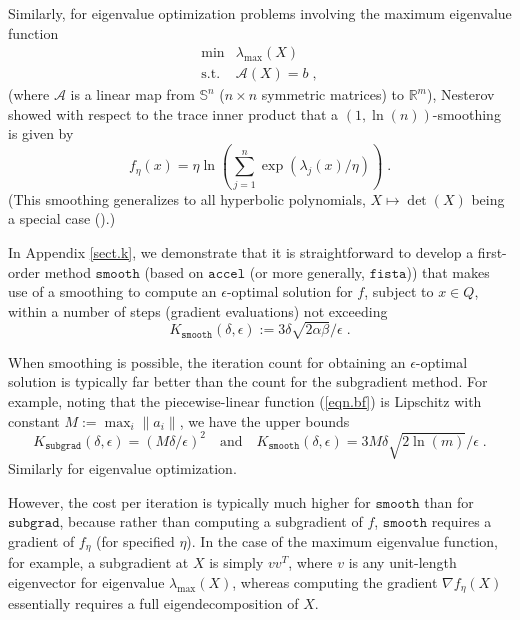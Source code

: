 \documentclass[reqno, 11pt]{amsart}
\numberwithin{equation}{section}
\newcommand{\subgrad}{\mathtt{subgrad}}
\newcommand{\accel}{\mathtt{accel}}
\newcommand{\fista}{\mathtt{fista}}
\newcommand{\smooth}{\mathtt{smooth}}
\newcommand{\grad}{\nabla}
\newcommand{\Sym}{ \mathbb{S}^n }
\begin{document}
Similarly, for eigenvalue optimization problems involving the maximum eigenvalue function
\[ \begin{array}{rl} \min & \lambda_{\max}(X) \\
\textrm{s.t.} & {\mathcal A}(X) = b \; , \end{array} \]
(where $ {\mathcal A} $ is a linear map from $ \Sym $ ($ n \times n $ symmetric matrices) to $ \mathbb{R}^{m} $), Nesterov\cite{nesterov2007smoothing}  showed with respect to the trace inner product that a $ (1, \ln(n)) $-smoothing is given by
\begin{equation}  \label{eqn.bh} 
    f_{\eta}(x) = \eta \ln \left( \sum_{j=1}^n \exp ( \lambda_j(x) / \eta) \right)  \; . 
\end{equation}
(This smoothing generalizes to all hyperbolic polynomials, $ X \mapsto \det(X)  $ being a special case (\cite{renegar2017accelerated}).)  

In Appendix \ref{sect.k}, we demonstrate that it is straightforward to develop a first-order method $ \smooth $ (based on $ \accel $ (or more generally, $ \fista $)) that makes use of a smoothing to compute an $ \epsilon $-optimal solution for $ f $, subject to $ x \in Q $, within a number of steps (gradient evaluations) not exceeding
\begin{equation}  \label{eqn.bi} 
K_{\smooth}(\delta, \epsilon) := 3 \delta \sqrt{2 \alpha \beta }/ \epsilon \; . 
\end{equation}

When smoothing is possible, the iteration count for obtaining an $ \epsilon $-optimal solution is typically far better than the count for the subgradient method. For example, noting that the piecewise-linear function (\ref{eqn.bf}) is Lipschitz with constant $ M := \max_i \| a_i \| $, we have the upper bounds
\[   K_{\subgrad}(\delta, \epsilon) = (M \delta/ \epsilon)^2 \quad \textrm{and} \quad K_{\smooth}(\delta, \epsilon) = 3 M \delta \sqrt{2 \ln(m)} / \epsilon \; . \]
Similarly for eigenvalue optimization.

However, the cost per iteration is typically much higher for $ \smooth $ than for $ \subgrad $, because rather than computing a subgradient of $ f $, $ \smooth $ requires a gradient of $ f_{\eta} $ (for specified $ \eta $). In the case of the maximum eigenvalue function, for example, a subgradient at $ X $ is simply $ v v^T $, where $ v $ is any unit-length eigenvector for eigenvalue $ \lambda_{\max}(X) $, whereas computing the gradient $ \grad f_{\eta}(X) $ essentially requires a full eigendecomposition of $ X $.      
 
\end{document}
